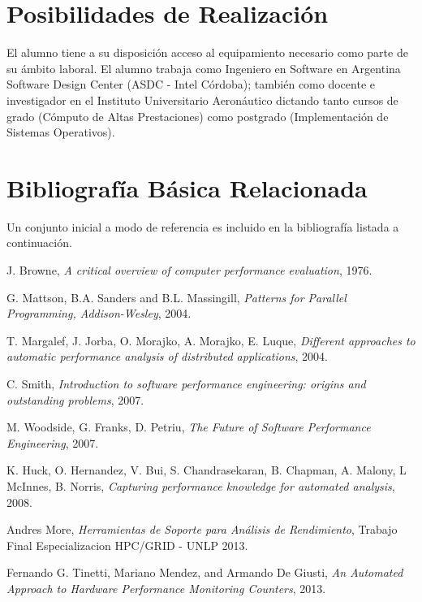 \documentclass[a4paper]{article}
\begin{document}
\section{Posibilidades de Realización}

El alumno tiene a su disposición acceso al equipamiento necesario como parte de su ámbito laboral.
El alumno trabaja como Ingeniero en Software en Argentina Software Design Center (ASDC - Intel Córdoba); también
como docente e investigador en el Instituto Universitario Aeronáutico dictando tanto cursos de grado (Cómputo de Altas Prestaciones) como postgrado (Implementación de Sistemas Operativos).

\section{Bibliografía Básica Relacionada}

Un conjunto inicial a modo de referencia es incluido en la bibliografía listada a continuación.

\begin{thebibliography}{9}
  
 J. Browne,
 \emph{A critical overview of computer performance evaluation},
 1976.

 G. Mattson, B.A. Sanders and B.L. Massingill, 
 \emph{Patterns for Parallel Programming, Addison-Wesley},
 2004.

 T. Margalef, J. Jorba, O. Morajko, A. Morajko, E. Luque,
 \emph{Different approaches to automatic performance analysis of distributed applications},
 2004.

 C. Smith,
 \emph{Introduction to software performance engineering: origins and outstanding problems},
 2007.

 M. Woodside, G. Franks, D. Petriu,
 \emph{The Future of Software Performance Engineering},
 2007.

 K. Huck, O. Hernandez, V. Bui, S. Chandrasekaran, B. Chapman, A. Malony, L McInnes, B. Norris,
 \emph{Capturing performance knowledge for automated analysis},
 2008.

  Andres More,
 \emph{Herramientas de Soporte para Análisis de Rendimiento},
 Trabajo Final Especializacion HPC/GRID - UNLP 2013.

  Fernando G. Tinetti, Mariano Mendez, and Armando De Giusti,
  \emph{An Automated Approach to Hardware Performance Monitoring Counters},
  2013. 


\end{thebibliography}
\end{document}
